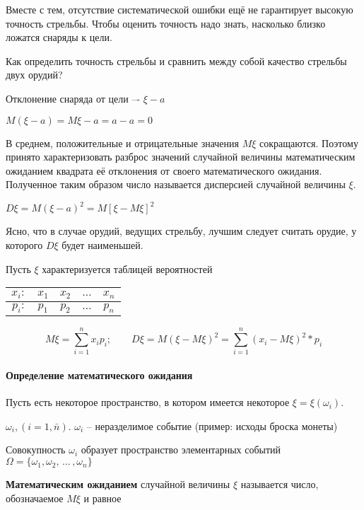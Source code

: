 \documentclass[a4paper,12pt]{report}
\newcommand*{\term}[1]{\textbf{#1}}
\newcommand{\sudots}{\,\ldots\,}
\begin{document}
	Вместе с тем, отсутствие систематической ошибки ещё не гарантирует высокую точность стрельбы. Чтобы оценить точность надо знать, насколько близко ложатся снаряды к цели. 

	Как определить точность стрельбы и сравнить между собой качество стрельбы двух орудий?

	Отклонение снаряда от цели –- $\xi - a$

	
	$M(\xi - a) = M\xi - a = a - a = 0$


	В среднем, положительные и отрицательные значения $M\xi$ сокращаются. Поэтому принято характеризовать разброс значений случайной величины математическим ожиданием квадрата её отклонения от своего математического ожидания. Полученное таким образом число называется дисперсией случайной величины $\xi$. 


	$D\xi = M(\xi-a)^2 = M[\xi-M\xi]^2$


	Ясно, что в случае орудий, ведущих стрельбу, лучшим следует считать орудие, у которого $D\xi$ будет наименьшей.

	Пусть $\xi$ характеризуется таблицей вероятностей \strut


	\begin{tabular}{|r|c|c|c|c|}
	\hline
		$x_i:$ & $x_1$ & $x_2$ & $\ldots$ & $x_n$\\
	\hline	
		$p_i:$ & $p_1$ & $p_2$ & $\ldots$ & $p_n$\\
	\hline
	\end{tabular}

	
	\strut

	$$
	  M\xi = \sum^n_{i=1}x_ip_i;
	  \qquad
	  D\xi = M (\xi - M\xi)^2 
	       = \sum^n_{i=1}(x_i-M\xi)^2*p_i
	$$



\paragraph{Определение математического ожидания}

	Пусть есть некоторое пространство, в котором имеется некоторое $\xi = \xi(\omega_i)$.

	$\omega_i,(i=1,\bar n)$. $\omega_i$ – неразделимое событие (пример: исходы броска монеты)

	Совокупность $\omega_i$ образует пространство элементарных событий
	$\Omega = \{ \omega_1, \omega_2, \sudots, \omega_n \}$

	\term{Математическим ожиданием} случайной величины $\xi$ называется число, обозначаемое $M\xi$ и равное 
\end{document}
